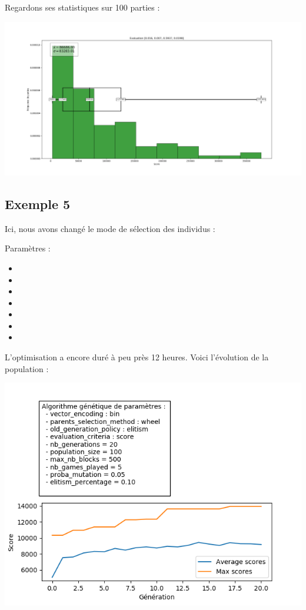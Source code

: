 Regardons ses statistiques sur 100 parties :

\includegraphics[scale=0.35]{media/results/Stats_Eval_0,016_0,007_0,5937_0,0198.png}

\newpage

\subsection{Exemple 5}

Ici, nous avons changé le mode de sélection des individus :

Paramètres :
\begin{itemize}
	\item {}
	\item {}
	\item {}
	\item {}
	\item {}
	\item {}
	\item {}
\end{itemize} 

L'optimisation a encore duré à peu près 12 heures. Voici l'évolution de la population :

\includegraphics[scale=0.95]{media/results/AG14.png}

